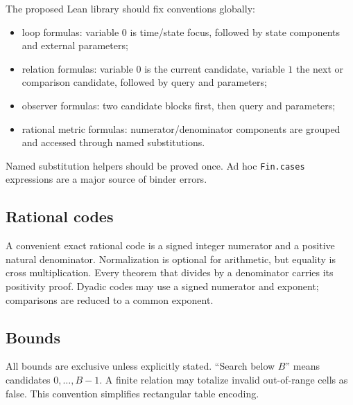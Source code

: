 The proposed Lean library should fix conventions globally:
\begin{itemize}
  \item loop formulas: variable \(0\) is time/state focus, followed by state components and external parameters;
  \item relation formulas: variable \(0\) is the current candidate, variable \(1\) the next or comparison candidate, followed by query and parameters;
  \item observer formulas: two candidate blocks first, then query and parameters;
  \item rational metric formulas: numerator/denominator components are grouped and accessed through named substitutions.
\end{itemize}
Named substitution helpers should be proved once.  Ad hoc \texttt{Fin.cases} expressions are a major source of binder errors.

\subsection{Rational codes}

A convenient exact rational code is a signed integer numerator and a positive natural denominator.  Normalization is optional for arithmetic, but equality is cross multiplication.  Every theorem that divides by a denominator carries its positivity proof.  Dyadic codes may use a signed numerator and exponent; comparisons are reduced to a common exponent.

\subsection{Bounds}

All bounds are exclusive unless explicitly stated.  ``Search below \(B\)'' means candidates \(0,\ldots,B-1\).  A finite relation may totalize invalid out-of-range cells as false.  This convention simplifies rectangular table encoding.

